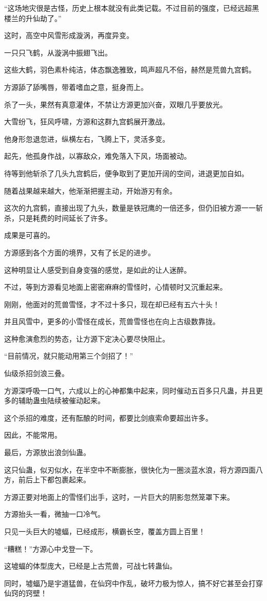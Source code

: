 \begin{this_body}
“这场地灾很是古怪，历史上根本就没有此类记载。不过目前的强度，已经远超黑楼兰的升仙劫了。”

这时，高空中风雪形成漩涡，再度异变。

一只只飞鹤，从漩涡中振翅飞出。

这些大鹤，羽色素朴纯洁，体态飘逸雅致，鸣声超凡不俗，赫然是荒兽九宫鹤。

方源舔了舔嘴唇，带着嗜血之意，挺身而上。

杀了一头，果然有真意灌体，不禁让方源更加兴奋，双眼几乎要放光。

大雪纷飞，狂风呼啸，方源和这群九宫鹤展开激战。

他身形忽退忽进，纵横左右，飞腾上下，灵活多变。

起先，他孤身作战，以寡敌众，难免落入下风，场面被动。

待等到他斩杀了几头九宫鹤后，便争取到了更加开阔的空间，进退更加自如。

随着战果越来越大，他渐渐把握主动，开始游刃有余。

这次的九宫鹤，直接出现了九头，数量是铁冠鹰的一倍还多，但仍旧被方源一一斩杀，只是耗费的时间延长了许多。

成果是可喜的。

方源感到各个方面的境界，又有了长足的进步。

这种明显让人感受到自身变强的感觉，是如此的让人迷醉。

不过，等到方源看见地面上密密麻麻的雪怪时，心情顿时又沉重起来。

刚刚，他面对的荒兽雪怪，才不过十多只，现在却已经有五六十头！

并且风雪中，更多的小雪怪在成长，荒兽雪怪也在向上古级数靠拢。

这种愈演愈烈的势态，让方源下定决心要尽快阻止。

“目前情况，就只能动用第三个剑招了！”

仙级杀招剑浪三叠。

方源深呼吸一口气，六成以上的心神都集中起来，同时催动五百多只凡蛊，并且更多的辅助蛊虫陆续被催动起来。

这个杀招的难度，还有酝酿的时间，都要比剑痕索命要超出许多。

因此，不能常用。

最后，方源放出浪剑仙蛊。

这只仙蛊，似刃似水，在半空中不断膨胀，很快化为一圈淡蓝水浪，将方源四面八方，前后上下都包裹起来。

方源正要对地面上的雪怪们出手，这时，一片巨大的阴影忽然笼罩下来。

方源抬头一看，微抽一口冷气。

只见一头巨大的墟蝠，已经成形，横霸长空，覆盖方圆上百里！

“糟糕！”方源心中戈登一下。

这墟蝠的体型庞大，已经是上古荒兽，可战七转蛊仙。

同时，墟蝠乃是宇道猛兽，在仙窍中作乱，破坏力极为惊人，搞不好它甚至会打穿仙窍的窍壁！

\end{this_body}

